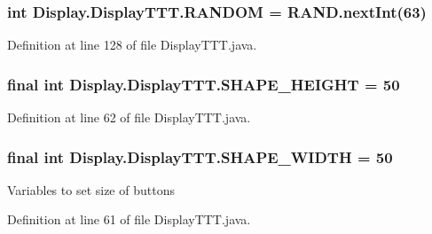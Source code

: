 \subsubsection[{R\+A\+N\+D\+O\+M}]{\setlength{\rightskip}{0pt plus 5cm}int Display.\+Display\+T\+T\+T.\+R\+A\+N\+D\+O\+M = R\+A\+N\+D.\+next\+Int(63)\hspace{0.3cm}{\ttfamily [private]}}\label{class_display_1_1_display_t_t_t_a30415017d1d80126ca6295a1d711684d}


Definition at line 128 of file Display\+T\+T\+T.\+java.

\hypertarget{class_display_1_1_display_t_t_t_ad7c69ef4532bf358596b4a2d09c22fbc}{}
\subsubsection[{S\+H\+A\+P\+E\+\_\+\+H\+E\+I\+G\+H\+T}]{\setlength{\rightskip}{0pt plus 5cm}final int Display.\+Display\+T\+T\+T.\+S\+H\+A\+P\+E\+\_\+\+H\+E\+I\+G\+H\+T = 50}\label{class_display_1_1_display_t_t_t_ad7c69ef4532bf358596b4a2d09c22fbc}


Definition at line 62 of file Display\+T\+T\+T.\+java.

\hypertarget{class_display_1_1_display_t_t_t_aba4c92bd721d0fb8718fbf9ed9d837e4}{}
\subsubsection[{S\+H\+A\+P\+E\+\_\+\+W\+I\+D\+T\+H}]{\setlength{\rightskip}{0pt plus 5cm}final int Display.\+Display\+T\+T\+T.\+S\+H\+A\+P\+E\+\_\+\+W\+I\+D\+T\+H = 50}\label{class_display_1_1_display_t_t_t_aba4c92bd721d0fb8718fbf9ed9d837e4}
Variables to set size of buttons 

Definition at line 61 of file Display\+T\+T\+T.\+java.

\hypertarget{class_display_1_1_display_t_t_t_a72b67bc50aa6ba47ae9d398e597c49bb}{}
